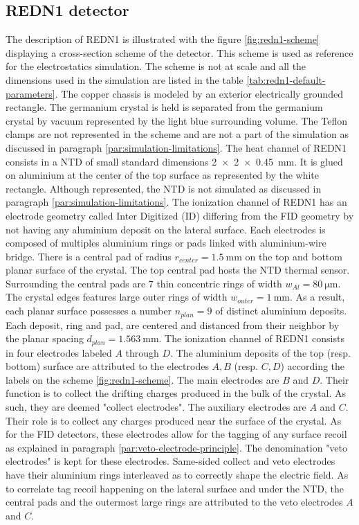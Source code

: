 \subsection{REDN1 detector}
\label{par:redn1-presentation}

The description of REDN1 is illustrated with the figure \ref{fig:redn1-scheme} displaying a cross-section scheme of the detector. This scheme is used as reference for the electrostatics simulation. The scheme is not at scale and all the dimensions used in the simulation are listed in the table \ref{tab:redn1-default-parameters}.
The copper chassis is modeled by an exterior electrically grounded rectangle. The germanium crystal is held is separated from the germanium crystal by vacuum represented by the light blue surrounding volume.
The Teflon clamps are not represented in the scheme and are not a part of the simulation as discussed in paragraph \ref{par:simulation-limitations}.
The heat channel of REDN1 consists in a NTD of small standard dimensions \SI{2 x 2 x 0.45}{\mm}. It is glued on aluminium at the center of the top surface as represented by the white rectangle. Although represented, the NTD is not simulated as discussed in paragraph \ref{par:simulation-limitations}.
The ionization channel of REDN1 has an electrode geometry called Inter Digitized (ID) differing from the FID geometry by not having any aluminium deposit on the lateral surface. Each electrodes is composed of multiples aluminium rings or pads linked with aluminium-wire bridge. There is a central pad of radius $r_{center}=\SI{1.5}{\mm}$ on the top and bottom planar surface of the crystal. The top central pad hosts the NTD thermal sensor. Surrounding the central pads are $7$ thin concentric rings of width $w_{Al} = \SI{80}{\micro\meter}$. The crystal edges features large outer rings of width $w_{outer}=\SI{1}{\mm}$. As a result, each planar surface possesses a number $n_{plan}=9$ of distinct aluminium deposits. Each deposit, ring and pad, are centered and distanced from their neighbor by the planar spacing $d_{plan} = \SI{1.563}{\mm}$.
The ionization channel of REDN1 consists in four electrodes labeled $A$ through $D$. The aluminium deposits of the top (resp. bottom) surface are attributed to the electrodes $A,B$ (resp. $C,D$) according the labels on the scheme \ref{fig:redn1-scheme}.
The main electrodes are $B$ and $D$. Their function is to collect the drifting charges produced in the bulk of the crystal. As such, they are deemed "collect electrodes".
The auxiliary electrodes are $A$ and $C$. Their role is to collect any charges produced near the surface of the crystal. As for the FID detectors, these electrodes allow for the tagging of any surface recoil as explained in paragraph \ref{par:veto-electrode-principle}. The denomination "veto electrodes" is kept for these electrodes.
Same-sided collect and veto electrodes have their aluminium rings interleaved as to correctly shape the electric field. As to correlate tag recoil happening on the lateral surface and under the NTD, the central pads and the outermost large rings are attributed to the veto electrodes $A$ and $C$. 

